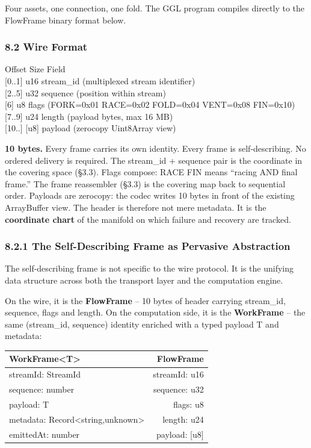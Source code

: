 \documentclass[
]{article}
\newcounter{none} %
\begin{document}
Four assets, one connection, one fold. The GGL program compiles directly
to the FlowFrame binary format below.

\subsubsection{\texorpdfstring{\textbf{8.2 Wire
Format}}{8.2 Wire Format}}\label{wire-format}

Offset Size Field\\
{[}0..1{]} u16 stream\_id (multiplexed stream identifier)\\
{[}2..5{]} u32 sequence (position within stream)\\
{[}6{]} u8 flags (FORK=0x01 \textbar{} RACE=0x02 \textbar{} FOLD=0x04
\textbar{} VENT=0x08 \textbar{} FIN=0x10)\\
{[}7..9{]} u24 length (payload bytes, max 16 MB)\\
{[}10..{]} {[}u8{]} payload (zerocopy Uint8Array view)

\textbf{10 bytes.} Every frame carries its own identity. Every frame is
self-describing. No ordered delivery is required. The stream\_id +
sequence pair is the coordinate in the covering space (§3.3). Flags
compose: RACE \textbar{} FIN means ``racing AND final frame.'' The frame
reassembler (§3.3) is the covering map back to sequential order.
Payloads are zerocopy: the codec writes 10 bytes in front of the
existing ArrayBuffer view. The header is therefore not mere metadata. It
is the \textbf{coordinate chart} of the manifold on which failure and
recovery are tracked.

\subsubsection{\texorpdfstring{\textbf{8.2.1 The Self-Describing Frame
as Pervasive
Abstraction}}{8.2.1 The Self-Describing Frame as Pervasive Abstraction}}\label{the-self-describing-frame-as-pervasive-abstraction}

The self-describing frame is not specific to the wire protocol. It is
the unifying data structure across both the transport layer and the
computation engine.

On the wire, it is the \textbf{FlowFrame} -- 10 bytes of header carrying
stream\_id, sequence, flags and length. On the computation side, it is
the \textbf{WorkFrame} -- the same (stream\_id, sequence) identity
enriched with a typed payload T and metadata:

{\def\LTcaptype{none} %
\begin{longtable}[]{@{}lr@{}}
\toprule\noalign{}
WorkFrame\textless T\textgreater{} & FlowFrame \\
\midrule\noalign{}
\endhead
\bottomrule\noalign{}
\endlastfoot
streamId: StreamId & streamId: u16 \\
sequence: number & sequence: u32 \\
payload: T & flags: u8 \\
metadata: Record\textless string,unknown\textgreater{} & length: u24 \\
emittedAt: number & payload: {[}u8{]} \\
\end{longtable}
}
\end{document}

